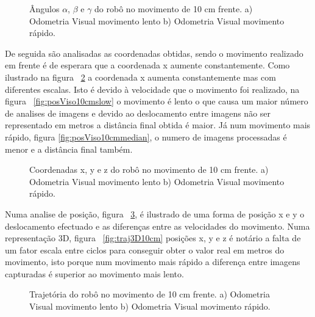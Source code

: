 \begin{figure}[h!]
	\centering
	\qquad
	\caption{Ângulos $\alpha$, $\beta$ e $\gamma$ do robô  no movimento de 10 cm frente. a) Odometria Visual movimento lento b) Odometria Visual movimento rápido.}
	\label{fig:ang10cm}
\end{figure}


De seguida são analisadas as coordenadas obtidas, sendo o movimento realizado em frente é de esperara que a coordenada x aumente constantemente. Como ilustrado na figura ~\ref{fig:pos10cm} a coordenada x aumenta constantemente mas com diferentes escalas. Isto é devido à velocidade que o movimento foi realizado, na figura ~\ref{fig:posViso10cmslow} o movimento é lento o que causa um maior número de analises de imagens e devido ao deslocamento entre imagens não ser representado em metros a distância final obtida é maior. Já num movimento mais rápido, figura \ref{fig:posViso10cmmedian}, o numero de imagens processadas é menor e a distância final também.


\begin{figure}[h!]
	\centering
	\qquad
	\caption{Coordenadas x, y e z do robô no movimento de 10 cm frente. a) Odometria Visual movimento lento b) Odometria Visual movimento rápido.}
	\label{fig:pos10cm}
\end{figure}


Numa analise de posição, figura ~\ref{fig:traj10cm}, é ilustrado de uma forma de posição x e y o deslocamento efectuado e as diferenças entre as velocidades do movimento. Numa representação 3D, figura ~\ref{fig:traj3D10cm} posições x, y  e z é notário a falta de um fator escala entre ciclos para conseguir obter o valor real em metros do movimento, isto porque num movimento mais rápido a diferença entre imagens capturadas é superior ao movimento mais lento. 


\begin{figure}[h!]
	\centering
	\qquad
	\caption{Trajetória do robô no movimento de 10 cm frente. a) Odometria Visual movimento lento b) Odometria Visual movimento rápido.}
	\label{fig:traj10cm}
\end{figure}




